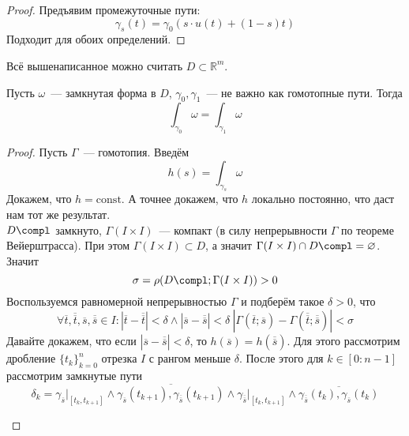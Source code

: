 \documentclass{article}
\begin{document}
    \begin{proof}
        Предъявим промежуточные пути:
        $$
        \gamma_s(t)=\gamma_0(s\cdot u(t)+(1-s)t)
        $$
        Подходит для обоих определений.
    \end{proof}
    \begin{remark}
        Всё вышенаписанное можно считать $D\subset\mathbb R^m$.
    \end{remark}
    \begin{theorem}
        \label{Равенство интегралов по гомотопным путям}
        Пусть $\omega$~--- замкнутая форма в $D$, $\gamma_0,\gamma_1$~--- не важно как гомотопные пути. Тогда
        $$
        \int_{\gamma_0}\omega=\int_{\gamma_1}\omega
        $$
    \end{theorem}
    \begin{proof}
        Пусть $\Gamma$~--- гомотопия. Введём
        $$
        h(s)=\int_{\gamma_s}\omega
        $$
        Докажем, что $h=\mathrm{const}$. А точнее докажем, что $h$ локально постоянно, что даст нам тот же результат.\\
        $D\compl$ замкнуто, $\Gamma(I\times I)$~--- компакт (в силу непрерывности $\Gamma$ по теореме Вейерштрасса). При этом $\Gamma(I\times I)\subset D$, а значит $\Gamma(I\times I)\cap D\compl=\varnothing$. Значит
        $$\sigma=\rho(D\compl;\Gamma(I\times I))>0$$
        Воспользуемся равномерной непрерывностью $\Gamma$ и подберём такое $\delta>0$, что
        $$\forall\overline t,\overline{\overline t},\overline s,\overline{\overline s}\in I:|\overline t-\overline{\overline t}|<\delta\land|\overline s-\overline{\overline s}|<\delta~|\Gamma(\overline t;\overline s)-\Gamma(\overline{\overline t};\overline{\overline s})|<\sigma$$
        Давайте докажем, что если $|\overline s-\overline{\overline s}|<\delta$, то $h(\overline s)=h(\overline{\overline s})$. Для этого рассмотрим дробление $\{t_k\}_{k=0}^n$ отрезка $I$ с рангом меньше $\delta$. После этого для $k\in[0:n-1]$ рассмотрим замкнутые пути
        $$
        \delta_k = \gamma_{\overline s}\Big|_{[t_k,t_{k+1}]}
        \wedge\overline{\gamma_ {\overline s}(t_{k+1}),\gamma_{\overline{\overline s}}(t_{k+1})}
        \wedge\gamma_{\overline{\overline s}}\Big|_{[t_k,t_{k+1}]}
        \wedge\overline{\gamma_{\overline{\overline s}}(t_k),\gamma_{\overline s}(t_k)}
        $$
        \begin{figure}[H]
            \begin{tikzpicture}[scale=.05]

\end{tikzpicture}
\end{figure}
\end{proof}
\end{document}

